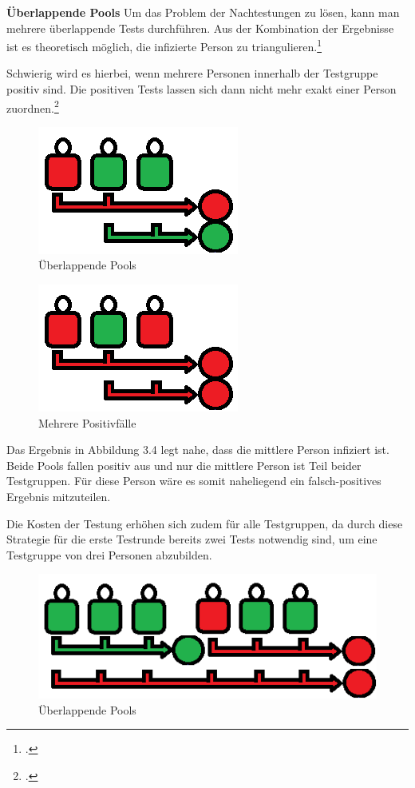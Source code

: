 \textbf{Überlappende Pools}\newline
Um das Problem der Nachtestungen zu lösen, kann man mehrere überlappende Tests durchführen.
Aus der Kombination der Ergebnisse ist es theoretisch möglich, die infizierte Person zu triangulieren.\footcite{verwilt_evaluation_2021}

Schwierig wird es hierbei, wenn mehrere Personen innerhalb der Testgruppe positiv sind.
Die positiven Tests lassen sich dann nicht mehr exakt einer Person zuordnen.\footcite{viehweger_increased_2020}

\begin{figure}[h]
	\centering
	\includegraphics[width=.35\textwidth]{img/KomplexePools}
	\caption{Überlappende Pools\footnotemark}
\end{figure}

\cleardoublepage

\begin{figure}[h]
	\centering
	\includegraphics[width=.35\textwidth]{img/MehrerePositiv}
	\caption{Mehrere Positivfälle\footnotemark}
\end{figure}
Das Ergebnis in Abbildung 3.4 legt nahe, dass die mittlere Person infiziert ist.
Beide Pools fallen positiv aus und nur die mittlere Person ist Teil beider Testgruppen.
Für diese Person wäre es somit naheliegend ein falsch-positives Ergebnis mitzuteilen.

Die Kosten der Testung erhöhen sich zudem für alle Testgruppen, da durch diese Strategie für die erste Testrunde bereits zwei Tests notwendig sind, um eine Testgruppe von drei Personen abzubilden.

\begin{figure}[h]
	\centering
	\includegraphics[width=.7\textwidth]{img/GrossePooluebersicht}
	\caption{Überlappende Pools\footnotemark}
\end{figure}

